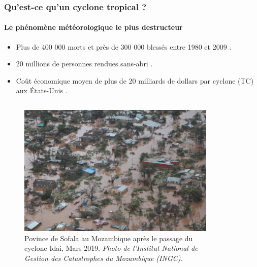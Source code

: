 \documentclass[aspectratio=169, usepdftitle=false, xcolor={dvipsnames}, 9pt]{beamer}
\begin{document}
\begin{frame}[c]
    \frametitle{Qu'est-ce qu'un cyclone tropical ?}
    \framesubtitle{Le phénomène météorologique le plus destructeur}
    \begin{definition}
        \footnotesize
        \begin{itemize}
            \item Plus de 400 000 morts et près de 300 000 blessés entre 1980 et 2009 \parencite{doocy_human_2013}.
            \item 20 millions de personnes rendues sans-abri \parencite{doocy_human_2013}.
            \item Coût économique moyen de plus de 20 milliards de dollars par cyclone (TC) aux États-Unis \parencite{smith_billiondollar_2020}.
        \end{itemize} 
    \end{definition}
    \begin{columns}
        \begin{column}{0.45\textwidth}
            \begin{figure}[h]
                \centering
                \includegraphics[width=0.97\textwidth]{Figures/idai_2019_sofala_province.jpg}
                \caption{Povince de Sofala au Mozambique après le passage du \mbox{cyclone} Idai, Mars 2019. \textit{Photo de l'Institut National
                de Gestion des Catastrophes du Mozambique (INGC).}}
            \end{figure}
        \end{column}
        \begin{column}{0.45\textwidth}
             \begin{figure}[h]
                 \centering

\end{figure}
\end{column}
\end{columns}
\end{frame}
\end{document}
